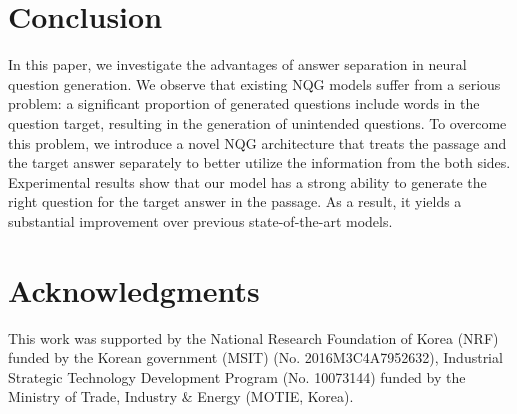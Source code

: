 \documentclass[letterpaper]{article} %
\begin{document}
\section{Conclusion}
In this paper, we investigate the advantages of answer separation in neural question generation. We observe that existing NQG models suffer from a serious problem: a significant proportion of generated questions include words in the question target, resulting in the generation of unintended questions. To overcome this problem, we introduce a novel NQG architecture that treats the passage and the target answer separately to better utilize the information from the both sides. Experimental results show that our model has a strong ability to generate the right question for the target answer in the passage. As a result, it yields a substantial improvement over previous state-of-the-art models.



\section{Acknowledgments}
This work was supported by the National Research Foundation of Korea (NRF) funded by the Korean government (MSIT) (No. 2016M3C4A7952632), Industrial Strategic Technology Development Program (No. 10073144) funded by the Ministry of Trade, Industry \& Energy (MOTIE, Korea).




\end{document}
